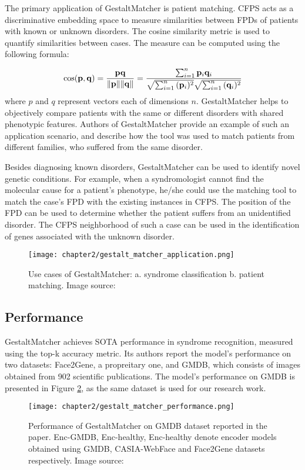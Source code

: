 \documentclass[../report.tex]{subfiles}
\begin{document}
    
    The primary application of GestaltMatcher is patient matching. CFPS acts as a discriminative embedding space to measure similarities between FPDs of patients with known or unknown disorders. The cosine similarity metric is used to quantify similarities between cases. The measure can be computed using the following formula: 
 
    \begin{equation}
    	\cos ({\bf p},{\bf q})= {{\bf p} {\bf q} \over \|{\bf p}\| \|{\bf q}\|} = \frac{ \sum_{i=1}^{n}{{\bf p}_i{\bf q}_i} }{ \sqrt{\sum_{i=1}^{n}{({\bf p}_i)^2}} \sqrt{\sum_{i=1}^{n}{({\bf q}_i)^2}} }
    \end{equation}
	where $p$ and $q$ represent vectors each of dimensions $n$.
    GestaltMatcher helps to objectively compare patients with the same or different disorders with shared phenotypic features. Authors of GestaltMatcher provide an example of such an application scenario, and describe how the tool was used to match patients from different families, who suffered from the same disorder. 
    
    Besides diagnosing known disorders, GestaltMatcher can be used to identify novel genetic conditions. For example, when a syndromologist cannot find the molecular cause for a patient's phenotype, he/she could use the matching tool to match the case's FPD with the existing instances in CFPS. The position of the FPD can be used to determine whether the patient suffers from an unidentified disorder. The CFPS neighborhood of such a case can be used in the identification of genes associated with the unknown disorder. 
    \begin{figure}[ht]
    	\hspace*{1.0cm}      
    	\texttt{[image: chapter2/gestalt\_matcher\_application.png]}
    	\caption[Use cases of GestaltMatcher]{Use cases of GestaltMatcher: a. syndrome classification b. patient matching. Image source: \cite{hsieh2022gestaltmatcher}}
    	\label{fig_app_gest_matcher_chap2}
    \end{figure}
    \subsection{Performance}
    \noindent
    GestaltMatcher achieves SOTA performance in syndrome recognition, measured using the top-k accuracy metric. Its authors report the model's performance on two datasets: Face2Gene, a propreitary one, and GMDB, which consists of images obtained from 902 scientific publications. The model's performance on GMDB is presented in Figure \ref{fig_gm_perf}, as the same dataset is used for our research work.
    \begin{figure}[ht]
    	\centering
    	\texttt{[image: chapter2/gestalt\_matcher\_performance.png]}
    	\caption[Performance of GestaltMatcher on GMDB dataset reported in the paper]{Performance of GestaltMatcher on GMDB dataset reported in the paper. Enc-GMDB, Enc-healthy, Enc-healthy denote encoder models obtained using GMDB, CASIA-WebFace and Face2Gene datasets respectively. Image source: \cite{hsieh2022gestaltmatcher}}
    	\label{fig_gm_perf}
    \end{figure}  
\end{document}

